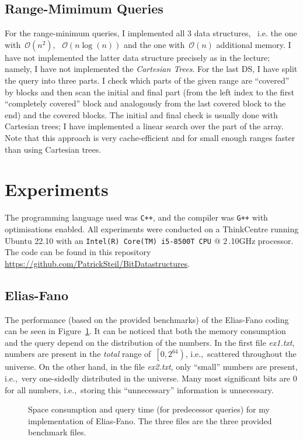 \documentclass[a4paper,UKenglish,cleveref, autoref, thm-restate]{lipics-v2021}
\newcommand{\codestyling}[1]{\texttt{#1}}
\newcommand{\ie}{i.e.,\xspace~}
\begin{document}
	\subsection{Range-Mimimum Queries}
	For the range-minimum queries, I implemented all 3 data structures, \, i.e. the one with~$\mathcal{O}\left(n^2\right)$, ~$\mathcal{O}\left(n \log\left(n\right)\right)$ and the one with~$\mathcal{O}\left(n\right)$ additional memory. I have not implemented the latter data structure precisely as in the lecture; namely, I have not implemented the \textit{Cartesian Trees}. For the last DS, I have split the query into three parts. I check which parts of the given range are ``covered'' by blocks and then scan the initial and final part (from the left index to the first ``completely covered'' block and analogously from the last covered block to the end) and the covered blocks. The initial and final check is usually done with Cartesian trees; I have implemented a linear search over the part of the array. Note that this approach is very cache-efficient and for small enough ranges faster than using Cartesian trees.
	
	\section{Experiments}
	The programming language used was \codestyling{C++}, and the compiler was \codestyling{G++} with optimisations enabled. All experiments were conducted on a ThinkCentre running Ubuntu 22.10 with an \codestyling{Intel(R) Core(TM) i5-8500T CPU} @ 2\,.10GHz processor. The code can be found in this repository \url{https://github.com/PatrickSteil/BitDatastructures}.
	\subsection{Elias-Fano}
	The performance (based on the provided benchmarks) of the Elias-Fano coding can be seen in Figure~\ref{fig:ef}. It can be noticed that both the memory consumption and the query depend on the distribution of the numbers. In the first file \textit{ex1.txt},  numbers are present in the \textit{total} range of~$\left[0, 2^{64}\right)$, \ie scattered throughout the universe. On the other hand, in the file \textit{ex2.txt}, only ``small'' numbers are present, \ie very one-sidedly distributed in the universe. Many most significant bits are 0 for all numbers, \ie storing this ``unnecessary'' information is unnecessary.	
	\begin{figure}[htbp]
		\begin{center}
			\resizebox{.9\linewidth}{!}{
				
			}
			\caption{Space consumption and query time (for  predecessor queries) for my implementation of Elias-Fano. The three files are the three provided benchmark files.}
			\label{fig:ef}
		\end{center}
	\end{figure}
\end{document}
